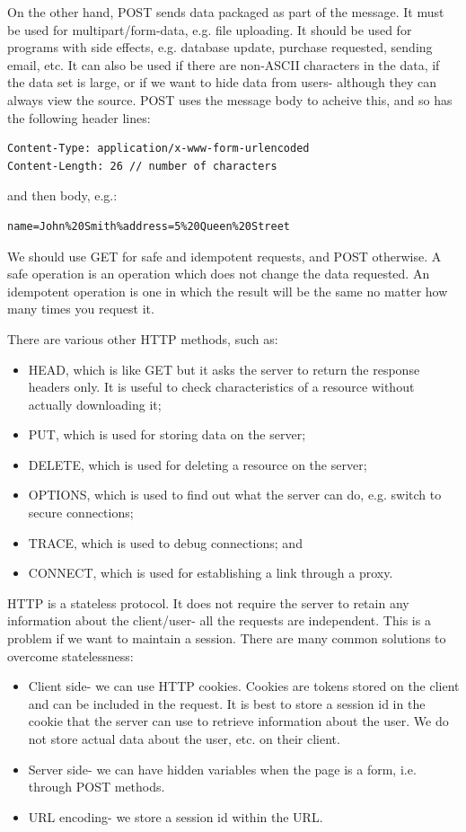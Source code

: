 \documentclass[a4paper, openany]{memoir}
\begin{document}
On the other hand, POST sends data packaged as part of the message. It must be used for multipart/form-data, e.g. file uploading. It should be used for programs with side effects, e.g. database update, purchase requested, sending email, etc. It can also be used if there are non-ASCII characters in the data, if the data set is large, or if we want to hide data from users- although they can always view the source. POST uses the message body to acheive this, and so has the following header lines:
\begin{verbatim}
Content-Type: application/x-www-form-urlencoded
Content-Length: 26 // number of characters
\end{verbatim}
and then body, e.g.:
\begin{verbatim}
name=John%20Smith%address=5%20Queen%20Street
\end{verbatim}
We should use GET for safe and idempotent requests, and POST otherwise. A safe operation is an operation which does not change the data requested. An idempotent operation is one in which the result will be the same no matter how many times you request it.

There are various other HTTP methods, such as:
\begin{itemize}
    \item HEAD, which is like GET but it asks the server to return the response headers only. It is useful to check characteristics of a resource without actually downloading it;
    \item PUT, which is used for storing data on the server;
    \item DELETE, which is used for deleting a resource on the server;
    \item OPTIONS, which is used to find out what the server can do, e.g. switch to secure connections;
    \item TRACE, which is used to debug connections; and
    \item CONNECT, which is used for establishing a link through a proxy.
\end{itemize}
HTTP is a stateless protocol. It does not require the server to retain any information about the client/user- all the requests are independent. This is a problem if we want to maintain a session. There are many common solutions to overcome statelessness:
\begin{itemize}
    \item Client side- we can use HTTP cookies. Cookies are tokens stored on the client and can be included in the request. It is best to store a session id in the cookie that the server can use to retrieve information about the user. We do not store actual data about the user, etc. on their client.
    \item Server side- we can have hidden variables when the page is a form, i.e. through POST methods.
    \item URL encoding- we store a session id within the URL.
\end{itemize}
\newpage
\end{document}
